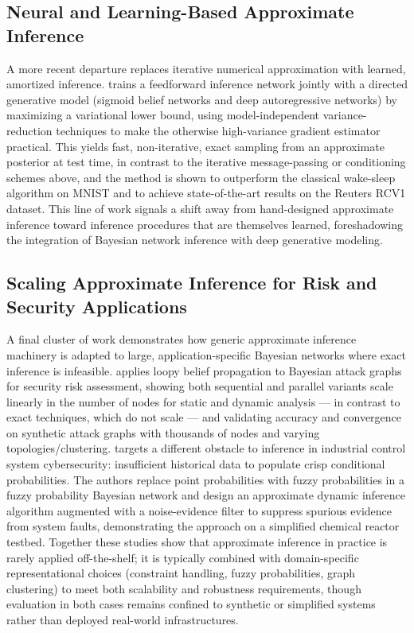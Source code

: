 \subsection{Neural and Learning-Based Approximate Inference}
A more recent departure replaces iterative numerical approximation with learned, amortized inference. \cite{mnih2014neural} trains a feedforward inference network jointly with a directed generative model (sigmoid belief networks and deep autoregressive networks) by maximizing a variational lower bound, using model-independent variance-reduction techniques to make the otherwise high-variance gradient estimator practical. This yields fast, non-iterative, exact sampling from an approximate posterior at test time, in contrast to the iterative message-passing or conditioning schemes above, and the method is shown to outperform the classical wake-sleep algorithm on MNIST and to achieve state-of-the-art results on the Reuters RCV1 dataset. This line of work signals a shift away from hand-designed approximate inference toward inference procedures that are themselves learned, foreshadowing the integration of Bayesian network inference with deep generative modeling.

\subsection{Scaling Approximate Inference for Risk and Security Applications}
A final cluster of work demonstrates how generic approximate inference machinery is adapted to large, application-specific Bayesian networks where exact inference is infeasible. \cite{munozgonzalez2017efficient} applies loopy belief propagation to Bayesian attack graphs for security risk assessment, showing both sequential and parallel variants scale linearly in the number of nodes for static and dynamic analysis --- in contrast to exact techniques, which do not scale --- and validating accuracy and convergence on synthetic attack graphs with thousands of nodes and varying topologies/clustering. \cite{zhang2017fuzzy} targets a different obstacle to inference in industrial control system cybersecurity: insufficient historical data to populate crisp conditional probabilities. The authors replace point probabilities with fuzzy probabilities in a fuzzy probability Bayesian network and design an approximate dynamic inference algorithm augmented with a noise-evidence filter to suppress spurious evidence from system faults, demonstrating the approach on a simplified chemical reactor testbed. Together these studies show that approximate inference in practice is rarely applied off-the-shelf; it is typically combined with domain-specific representational choices (constraint handling, fuzzy probabilities, graph clustering) to meet both scalability and robustness requirements, though evaluation in both cases remains confined to synthetic or simplified systems rather than deployed real-world infrastructures.

